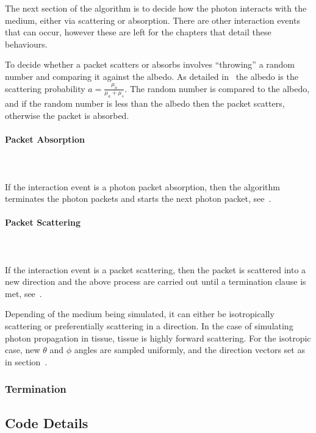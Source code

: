 The next section of the algorithm is to decide how the photon interacts with the medium, either via scattering or absorption. There are other interaction events that can occur, however these are left for the chapters that detail these behaviours.
\medskip

To decide whether a packet scatters or absorbs involves ``throwing'' a random number and comparing it against the albedo. As detailed in~ the albedo is the scattering probability $a=\tfrac{\mu_a}{\mu_a+\mu_s}$. The random number is compared to the albedo, and if the random number is less than the albedo then the packet scatters, otherwise the packet is absorbed.

\paragraph{Packet Absorption}\hspace{0pt}\\
\\
If the interaction event is a photon packet absorption, then the algorithm terminates the photon packets and starts the next photon packet, see~.

\paragraph{Packet Scattering}\hspace{0pt}\\
\\
If the interaction event is a packet scattering, then the packet is scattered into a new direction and the above process are carried out until a termination clause is met, see~.

Depending of the medium being simulated, it can either be isotropically scattering or preferentially scattering in a direction. In the case of simulating photon propagation in tissue, tissue is highly forward scattering. For the isotropic case, new $\theta$ and $\phi$ angles are sampled uniformly, and the direction vectors set as in section~.

\subsubsection*{Termination}\label{sec:terminator}

\subsection{Code Details}

